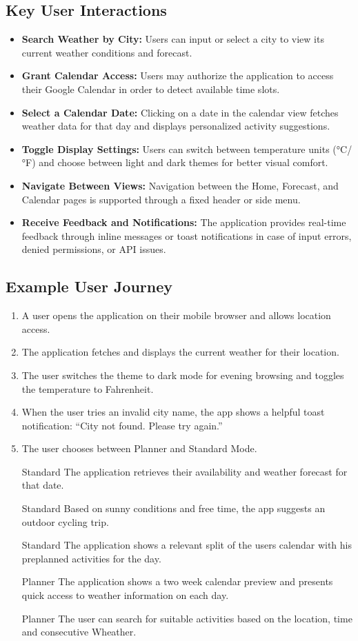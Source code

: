 \documentclass[fontsize=13pt,a4paper]{scrartcl}
\begin{document}
\subsection{Key User Interactions}
\begin{itemize}[nosep]
  \item \textbf{Search Weather by City:} Users can input or select a city to view its current weather conditions and forecast.
  \item \textbf{Grant Calendar Access:} Users may authorize the application to access their Google Calendar in order to detect available time slots.
  \item \textbf{Select a Calendar Date:} Clicking on a date in the calendar view fetches weather data for that day and displays personalized activity suggestions.
  \item \textbf{Toggle Display Settings:} Users can switch between temperature units (°C/°F) and choose between light and dark themes for better visual comfort.
  \item \textbf{Navigate Between Views:} Navigation between the Home, Forecast, and Calendar pages is supported through a fixed header or side menu.
  \item \textbf{Receive Feedback and Notifications:} The application provides real-time feedback through inline messages or toast notifications in case of input errors, denied permissions, or API issues.
\end{itemize}

\subsection{Example User Journey}
\begin{enumerate}[nosep]
  \item A user opens the application on their mobile browser and allows location access.
  \item The application fetches and displays the current weather for their location.
  \item The user switches the theme to dark mode for evening browsing and toggles the temperature to Fahrenheit.
  \item When the user tries an invalid city name, the app shows a helpful toast notification: “City not found. Please try again.”
  \item The user chooses between Planner and Standard Mode.
  \item [Standard] The application retrieves their availability and weather forecast for that date.
  \item [Standard] Based on sunny conditions and free time, the app suggests an outdoor cycling trip.
  \item [Standard] The application shows a relevant split of the users calendar with his preplanned activities for the day.
  \item [Planner] The application shows a two week calendar preview and presents quick access to weather information on each day.
  \item [Planner] The user can search for suitable activities based on the location, time and consecutive Wheather.
\end{enumerate}
\end{document}
